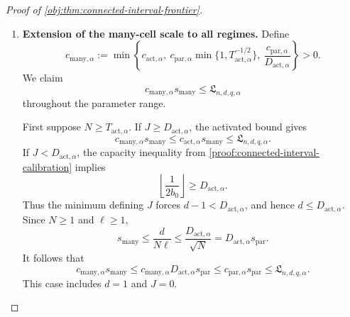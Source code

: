 \begin{proof}[Proof of \cref{obj:thm:connected-interval-frontier}]
\begin{enumerate}
For any honest procedure \(\mathsf I\), coverage of each grid point is
at least \(\beta\) under its corresponding sample law. By
\cref{obj:lem:randomized-kernel-tv-comparison}, under the reference law
\(P_{1/2}\) each point is contained in the returned interval with
probability at least
\(\beta-\eta_{\mathrm{cell}}=7\beta/8\). A connected interval
containing a given number of grid points has length at least their
spacing times that number minus one. Summing the inclusion
probabilities therefore gives
\[
\begin{aligned}
E_{P_{1/2}}[\operatorname{length}(\mathsf I)]
&\ge
\delta_{\mathrm{cell}}
\left[(M_{\mathrm{cell},\alpha}+1)\frac{7\beta}{8}-1\right]\\
&\ge\frac{3\beta}{4}w_{\mathrm{cell}},
\end{aligned}
\]
because \(1/M_{\mathrm{cell},\alpha}\le\beta/8\).
All interval risks lie in \([0,2]\), and the constant interval
\([-1,1]\) is honest. Hence taking the supremum over models and the
infimum over honest procedures preserves this lower bound. Finally,
\[
c_{\mathrm{par},\alpha}s_{\mathrm{par}}
\le
\frac{3\beta}{4}\frac{\eta_{\mathrm{cell}}}{4}s_{\mathrm{par}}
\le
\frac{3\beta}{4}w_{\mathrm{cell}}
\le\mathfrak L_{n,d,q,\alpha},
\]
which proves the asserted explicit floor.

\item \textbf{Extension of the many-cell scale to all regimes.}
Define
\[
c_{\mathrm{many},\alpha}
:=
\min\left\{
c_{\mathrm{act},\alpha},
\ c_{\mathrm{par},\alpha}
       \min\{1,T_{\mathrm{act},\alpha}^{-1/2}\},
\ \frac{c_{\mathrm{par},\alpha}}{D_{\mathrm{act},\alpha}}
\right\}>0.
\]
We claim
\[
c_{\mathrm{many},\alpha}s_{\mathrm{many}}
\le\mathfrak L_{n,d,q,\alpha}
\]
throughout the parameter range.

First suppose \(N\ge T_{\mathrm{act},\alpha}\). If
\(J\ge D_{\mathrm{act},\alpha}\), the activated bound gives
\[
c_{\mathrm{many},\alpha}s_{\mathrm{many}}
\le c_{\mathrm{act},\alpha}s_{\mathrm{many}}
\le\mathfrak L_{n,d,q,\alpha}.
\]
If \(J<D_{\mathrm{act},\alpha}\), the capacity inequality from \cref{proof:connected-interval-calibration}
implies
\[
\left\lfloor\frac1{2b_0}\right\rfloor
\ge D_{\mathrm{act},\alpha}.
\]
Thus the minimum defining \(J\) forces
\(d-1<D_{\mathrm{act},\alpha}\), and hence
\(d\le D_{\mathrm{act},\alpha}\). Since \(N\ge1\) and \(\ell\ge1\),
\[
s_{\mathrm{many}}
\le\frac{d}{N\ell}
\le\frac{D_{\mathrm{act},\alpha}}{\sqrt N}
=
D_{\mathrm{act},\alpha}s_{\mathrm{par}}.
\]
It follows that
\[
c_{\mathrm{many},\alpha}s_{\mathrm{many}}
\le
c_{\mathrm{many},\alpha}D_{\mathrm{act},\alpha}s_{\mathrm{par}}
\le c_{\mathrm{par},\alpha}s_{\mathrm{par}}
\le\mathfrak L_{n,d,q,\alpha}.
\]
This case includes \(d=1\) and \(J=0\).


\end{enumerate}
\end{proof}
